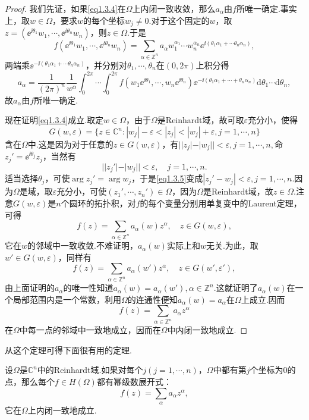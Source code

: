 \begin{proof}
	我们先证，如果\eqref{eq1.3.4}在$\Omega$上内闭一致收敛，那么$a_\alpha$由$f$所唯一确定.事实上，取$w\in\Omega$，要求$w$的每个坐标$w_j\neq0$.对于这个固定的$w$，取$z=(\ee^{\ii\theta_1}w_1,\cdots,\ee^{\ii\theta_n}w_n)$，则$z\in\Omega$.于是
	\[f(\ee^{\ii\theta_1}w_1,\cdots,\ee^{\ii\theta_n}w_n)=\sum_{\alpha\in\mathbb{Z}^n}a_\alpha w_1^{\alpha_1}\cdots w_n^{\alpha_n}\ee^{\ii(\theta_1\alpha_1+\cdots\theta_n\alpha_n)},\]
	两端乘$\ee^{-\ii(\theta_1\alpha_1+\cdots\theta_n\alpha_n)}$，并分别对$\theta_1,\cdots,\theta_n$在$(0,2\pi)$上积分得
	\[a_\alpha=\frac1{(2\pi)^n}\frac1{w^\alpha}\int_{0}^{2\pi}\cdots\int_{0}^{2\pi} f(w_1\ee^{\ii\theta_1},\cdots,w_n\ee^{\ii\theta_n})\ee^{-\ii(\theta_1\alpha_1+\cdots+\theta_n\alpha_n)}\mathrm{d}\theta_1\cdots\mathrm{d}\theta_n ,\]
	故$a_\alpha$由$f$所唯一确定.
	
	现在证明\eqref{eq1.3.4}成立.取定$w\in\Omega$，由于$\Omega$是Reinhardt域，故可取$\varepsilon$充分小，使得
	\[G(w,\varepsilon)=\{z\in\mathbb{C}^n\colon |w_j|-\varepsilon<|z_j|<|w_j|+\varepsilon,j=1,\cdots,n\}\]
	含在$\Omega$中.这是因为对于任意的$z\in G(w,\varepsilon)$，有$||z_j|-|w_j||<\varepsilon,j=1,\cdots,n,$命$z_j'=\ee^{\ii\theta_j}z_j$，当然有
	\begin{equation}\label{eq1.3.5}
		||z_j'|-|w_j||<\varepsilon,\quad j=1,\cdots,n.
	\end{equation}
适当选择$\theta_j$，可使$\arg z_j'=\arg w_j$，于是\eqref{eq1.3.5}变成$|z_j'-w_j|<\varepsilon,j=1,\cdots,n$.因为$\Omega$是域，取$\varepsilon$充分小，可使$(z_1',\cdots,z_n')\in\Omega$，因为$\Omega$是Reinhardt域，故$z\in\Omega$.注意$G(w,\varepsilon)$是$n$个圆环的拓扑积，对$f$的每个变量分别用单复变中的Laurent定理，可得
\[f(z)=\sum_{\alpha\in\mathbb{Z}^n}a_\alpha(w)z^\alpha,\quad z\in G(w,\varepsilon),\]
它在$w$的邻域中一致收敛.不难证明，$a_\alpha(w)$实际上和$w$无关.为此，取$w'\in G(w,\varepsilon)$，同样有
\[f(z)=\sum_{\alpha\in\mathbb{Z}^n} a_\alpha(w')z^\alpha,\quad z\in G(w',\varepsilon'),\]
由上面证明的$a_\alpha$的唯一性知道$a_\alpha(w)=a_\alpha(w'),\alpha\in\mathbb{Z}^n$.这就证明了$a_\alpha(w)$在一个局部范围内是一个常数，利用$\Omega$的连通性便知$a_\alpha(w)=a_\alpha$在$\Omega$上成立.因而
\[f(z)=\sum_{\alpha\in\mathbb{Z}^n} a_\alpha z^\alpha\]
在$\Omega$中每一点的邻域中一致地成立，因而在$\Omega$中内闭一致地成立.
\end{proof}
从这个定理可得下面很有用的定理.
\begin{theorem}\label{thm1.3.3}
	设$\Omega$是$\mathbb{C}^n$中的Reinhardt域.如果对每个$j(j=1,\cdots,n)$，$\Omega$中都有第$j$个坐标为$0$的点，那么每个$f\in H(\Omega)$都有幂级数展开式：
	\begin{equation}\label{eq1.3.6}
		f(z)=\sum_\alpha a_\alpha z^\alpha,
	\end{equation}
它在$\Omega$上内闭一致地成立.
\end{theorem}
